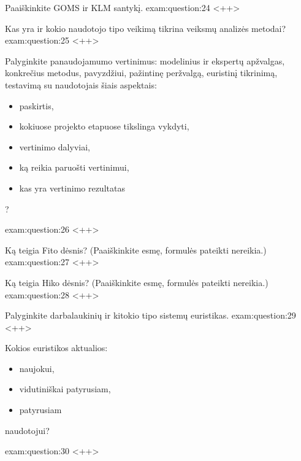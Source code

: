 \begin{question}{%
  Paaiškinkite GOMS ir KLM santykį.
  }{exam:question:24}
  <++>
\end{question}

\begin{question}{%
  Kas yra ir kokio naudotojo tipo veikimą tikrina veiksmų analizės metodai?
  }{exam:question:25}
  <++>
\end{question}

\begin{question}{%
  Palyginkite panaudojamumo vertinimus: modelinius ir ekspertų apžvalgas,
  konkrečius metodus, pavyzdžiui, pažintinę peržvalgą, euristinį
  tikrinimą, testavimą su naudotojais šiais aspektais:
  \begin{itemize}
    \item paskirtis,
    \item kokiuose projekto etapuose tikslinga vykdyti,
    \item vertinimo dalyviai,
    \item ką reikia paruošti vertinimui,
    \item kas yra vertinimo rezultatas
  \end{itemize}
  ?
  }{exam:question:26}
  <++>
\end{question}

\begin{question}{%
  Ką teigia Fito dėsnis? (Paaiškinkite esmę, formulės pateikti nereikia.)
  }{exam:question:27}
  <++>
\end{question}

\begin{question}{%
  Ką teigia Hiko dėsnis? (Paaiškinkite esmę, formulės pateikti nereikia.)
  }{exam:question:28}
  <++>
\end{question}

\begin{question}{%
  Palyginkite darbalaukinių ir kitokio tipo sistemų euristikas.
  }{exam:question:29}
  <++>
\end{question}

\begin{question}{%
  Kokios euristikos aktualios:
  \begin{itemize}
    \item naujokui,
    \item vidutiniškai patyrusiam,
    \item patyrusiam
  \end{itemize}
  naudotojui?
  }{exam:question:30}
  <++>
\end{question}

